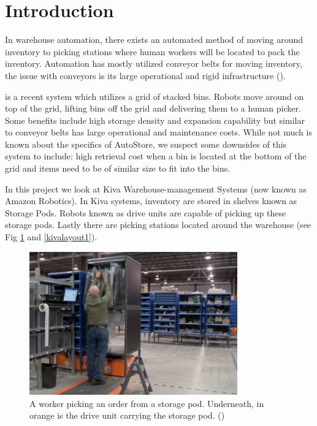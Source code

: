\documentclass[a4paper,11pt]{article}
\begin{document}
\section{Introduction}


In warehouse automation, there exists an automated method of moving around inventory to picking stations where human workers will be located to pack the inventory. Automation has mostly utilized conveyor belts for moving inventory, the issue with conveyors is its large operational and rigid infrastructure (\cite{wurman2008coordinating}).

\cite{introduction2015autostore} is a recent system which utilizes a grid of stacked bins. Robots move around on top of the grid, lifting bins off the grid and delivering them to a human picker. Some benefits include high storage density and expansion capability but similar to conveyor belts has large operational and maintenance costs. While not much is known about the specifics of AutoStore, we suspect some downsides of this system to include: high retrieval cost when a bin is located at the bottom of the grid and items need to be of similar size to fit into the bins.

In this project we look at Kiva Warehouse-management Systems (now known as Amazon Robotics). In Kiva systems, inventory are stored in shelves known as Storage Pods. Robots known as drive units are capable of picking up these storage pods. Lastly there are picking stations located around the warehouse (see Fig \ref{kivaprocess} and \ref{kivalayout1}). 
\begin{figure}[h!]
	\centering
	\includegraphics[width=0.8\textwidth ]{kivaprocess}
	\caption{A worker picking an order from a storage pod. Underneath, in orange is the drive unit carrying the storage pod. (\cite{kivayoutube2010quietlogistics})}
	\label{kivaprocess}
\end{figure}
\end{document}
